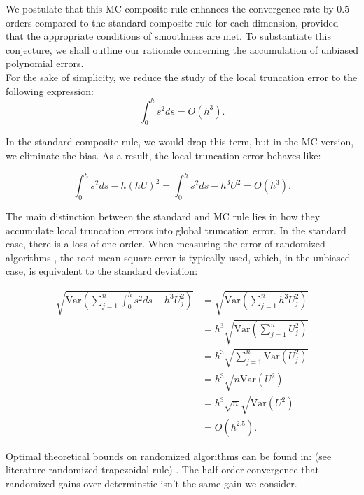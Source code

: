 \documentclass[a4paper,12pt]{article}
\begin{document}
We postulate that this MC composite rule enhances the convergence
rate by $0.5$ orders compared to the standard composite rule for each dimension,
provided that the appropriate conditions of smoothness are met.
To substantiate this conjecture, we shall outline our rationale concerning
the accumulation of unbiased polynomial errors.\\

For the sake of simplicity, we reduce the study of the local truncation error
to the following expression:
\begin{equation}
    \int_{0}^{h} s^{2}ds = O(h^{3}).
\end{equation}

In the standard composite rule, we would drop this term, but in
the MC version, we eliminate the bias. As a result,
the local truncation error behaves like:

\begin{equation}
    \int_{0}^{h} s^{2}ds- h(hU)^{2} = \int_{0}^{h} s^{2}ds- h^{3}U^{2} = O(h^{3}).
\end{equation}

The main distinction between the standard and MC rule lies in how they
accumulate local truncation errors into global truncation error. In the standard
case, there is a loss of one order. When measuring the error of randomized algorithms
, the root mean square error is typically used, which, in the unbiased case,
is equivalent to the standard deviation:

\begin{align}
    \sqrt{\text{Var}\left(\sum_{j=1}^{n} \int_{0}^{h} s^{2}ds- h^{3}U_{j}^{2}\right)}
     & =\sqrt{\text{Var}\left(\sum_{j=1}^{n} h^{3}U_{j}^{2}\right)}   \\
     & =h^{3} \sqrt{\text{Var}\left( \sum_{j=1}^{n} U_{j}^{2}\right)} \\
     & =h^{3} \sqrt{ \sum_{j=1}^{n}\text{Var} (U_{j}^{2})}            \\
     & =h^{3} \sqrt{ n \text{Var}(U^{2})}                             \\
     & =h^{3} \sqrt{n} \sqrt{ \text{Var}(U^{2})}                      \\
     & = O(h^{2.5}).
\end{align}


\begin{related}
    Optimal theoretical bounds on randomized algorithms can be found in:
    (see literature randomized trapezoidal rule)
    \cite{wu_randomised_2020}. The half order convergence that randomized
    gains over determinstic isn't the same gain we consider.
\end{related}
\end{document}
